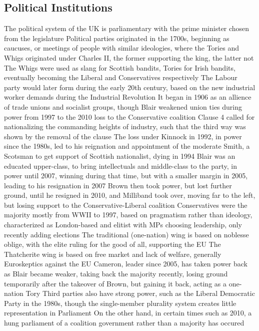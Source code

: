 \documentclass[11 pt, twoside]{article}
\newenvironment{outline*}
{
	\begin{outline}[enumerate]
	}
	{\end{outline}
}
\begin{document}
\subsection{Political Institutions}
\begin{outline*}
\1 The political system of the UK is parliamentary with the prime minister chosen from the legislature
\1 Political parties originated in the 1700s, beginning as caucuses, or meetings of people with similar ideologies, where the Tories and Whigs originated under Charles II, the former supporting the king, the latter not
\2 The Whigs were used as slang for Scottish bandits, Tories for Irish bandits, eventually becoming the Liberal and Conservatives respectively
\2 The Labour party would later form during the early 20th century, based on the new industrial worker demands during the Industrial Revolution
\3 It began in 1906 as an allience of trade unions and socialist groups, though Blair weakened union ties during power from 1997 to the 2010 loss to the Conservative coalition
\3 Clause 4 called for nationalizing the commanding heights of industry, such that the third way was shown by the removal of the clause
\3 The loss under Kinnock in 1992, in power since the 1980s, led to his reignation and appointment of the moderate Smith, a Scotsman to get support of Scottish nationalist, dying in 1994
\3 Blair was an educated upper-class, to bring intellectuals and middle-class to the party, in power until 2007, winning during that time, but with a smaller margin in 2005, leading to his resignation in 2007
\3 Brown then took power, but lost further ground, until he resigned in 2010, and Milliband took over, moving far to the left, but losing support to the Conservative-Liberal coalition
\2 Conservatives were the majority mostly from WWII to 1997, based on pragmatism rather than ideology, characterized as London-based and elitist with MPs choosing leadership, only recently adding elections
\3 The traditional (one-nation) wing is based on noblesse oblige, with the elite ruling for the good of all, supporting the EU
\3 The Thatcherite wing is based on free market and lack of welfare, generally Euroskeptics against the EU
\3 Cameron, leader since 2005, has taken power back as Blair became weaker, taking back the majority recently, losing ground temporarily after the takeover of Brown, but gaining it back, acting as a one-nation Tory
\2 Third parties also have strong power, such as the Liberal Democratic Party in the 1980s, though the single-member plurality system creates little representation in Parliament
\3 On the other hand, in certain times such as 2010, a hung parliament of a coalition government rather than a majority has occured

\end{outline*}
\end{document}
